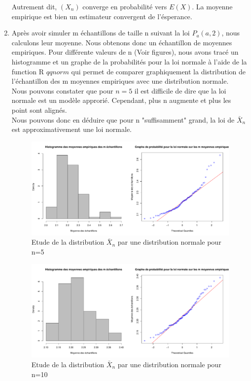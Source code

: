 \documentclass[12pt]{article}
\begin{document}
\begin{enumerate}
Autrement dit, $(X_n)$ converge en probabilit\'{e} vers $E(X)$. La moyenne empirique est bien un estimateur convergent de l'\'{e}sperance.

\item
Apr\`{e}s avoir simuler m \'{e}chantillons de taille n suivant la loi $P_a(a,2)$, nous calculons leur moyenne. Nous obtenons donc un \'{e}chantillon de  moyennes empiriques. Pour diff\'{e}rente valeurs de n (Voir figures), nous avons trac\'{e} un histogramme et un graphe de la probabilit\'{e}s pour la loi normale  \`{a} l'aide de la function R $qqnorm$ qui permet de comparer graphiquement la distribution de l'\'{e}chantillon des m moyennes empiriques avec une distribution normale.
\\
Nous pouvons constater que pour $n=5$ il est difficile de dire que la loi normale est un mod\`{e}le approri\'{e}. Cependant, plus n augmente et plus les point sont align\'{e}s. 
\\ 
Nous pouvons donc en d\'{e}duire que pour n "suffisamment" grand, la loi de $\bar X_n$ est approximativement une loi normale.
\begin{figure}[ht]
\centering
\includegraphics[width=1.0\textwidth]{figures/GraphP2Q51.pdf}
\caption{Etude de la distribution $\bar X_n$ par une distribution normale pour n=5}
\end{figure}

\begin{figure}[ht]
\centering
\includegraphics[width=1.0\textwidth]{figures/GraphP2Q52.pdf}
\caption{Etude de la distribution $ \bar X_n$ par une distribution normale pour n=10}
\end{figure}


\end{enumerate}
\end{document}
